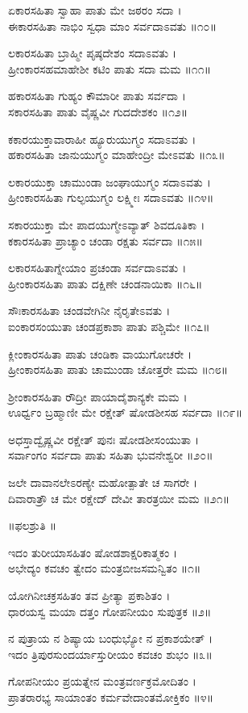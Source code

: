 ಏಕಾರಸಹಿತಾ ಸ್ವಾಹಾ ಪಾತು ಮೇ ಜಠರಂ ಸದಾ ।\\
ಈಕಾರಸಹಿತಾ ನಾಭಿಂ ಸ್ವಧಾ ಮಾಂ ಸರ್ವದಾಽವತು ॥೧೦॥

ಲಕಾರಸಹಿತಾ ಬ್ರಾಹ್ಮೀ ಪೃಷ್ಠದೇಶಂ ಸದಾಽವತು ।\\
ಹ್ರೀಂಕಾರಸಹಮಾಹೇಶೀ ಕಟಿಂ ಪಾತು ಸದಾ ಮಮ ॥೧೧॥

ಹಕಾರಸಹಿತಾ ಗುಹ್ಯಂ ಕೌಮಾರೀ ಪಾತು ಸರ್ವದಾ ।\\
ಸಕಾರಸಹಿತಾ ಪಾತು ವೈಷ್ಣವೀ ಗುದದೇಶಕಂ ॥೧೨॥

ಕಕಾರಯುಕ್ತಾವಾರಾಹೀ ಹ್ಯೂರುಯುಗ್ಮಂ ಸದಾಽವತು ।\\
ಹಕಾರಸಹಿತಾ ಜಾನುಯುಗ್ಮಂ ಮಾಹೇಂದ್ರೀ ಮೇಽವತು ॥೧೩॥

ಲಕಾರಯುಕ್ತಾ ಚಾಮುಂಡಾ ಜಂಘಾಯುಗ್ಮಂ ಸದಾಽವತು ।\\
ಹ್ರೀಂಕಾರಸಹಿತಾ ಗುಲ್ಫಯುಗ್ಮಂ ಲಕ್ಷ್ಮೀಃ ಸದಾಽವತು ॥೧೪॥

ಸಕಾರಯುಕ್ತಾ ಮೇ ಪಾದಯುಗ್ಮೇಽವ್ಯಾತ್ ಶಿವದೂತಿಕಾ ।\\
ಕಕಾರಸಹಿತಾ ಪ್ರಾಚ್ಯಾಂ ಚಂಡಾ ರಕ್ಷತು ಸರ್ವದಾ ॥೧೫॥

ಲಕಾರಸಹಿತಾಗ್ನೇಯಾಂ ಪ್ರಚಂಡಾ ಸರ್ವದಾಽವತು ।\\
ಹ್ರೀಂಕಾರಸಹಿತಾ ಪಾತು ದಕ್ಷಿಣೇ ಚಂಡನಾಯಿಕಾ ॥೧೬॥

ಸೌಃಕಾರಸಹಿತಾ ಚಂಡವೇಗಿನೀ ನೈರೃತೇಽವತು ।\\
ಐಂಕಾರಸಂಯುತಾ ಚಂಡಪ್ರಕಾಶಾ ಪಾತು ಪಶ್ಚಿಮೇ ॥೧೭॥

ಕ್ಲೀಂಕಾರಸಹಿತಾ ಪಾತು ಚಂಡಿಕಾ ವಾಯುಗೋಚರೇ ।\\
ಹ್ರೀಂಕಾರಸಹಿತಾ ಪಾತು ಚಾಮುಂಡಾ ಚೋತ್ತರೇ ಮಮ ॥೧೮॥

ಶ್ರೀಂಕಾರಸಹಿತಾ ರೌದ್ರೀ ಪಾಯಾದೈಶಾನ್ಯಕೇ ಮಮ ।\\
ಊರ್ಧ್ವಂ ಬ್ರಹ್ಮಾಣೀ ಮೇ ರಕ್ಷೇತ್ ಷೋಡಶೀಸಹ ಸರ್ವದಾ ॥೧೯॥

ಅಧಸ್ತಾದ್ವೈಷ್ಣವೀ ರಕ್ಷೇತ್ ಪುನಃ ಷೋಡಶೀಸಂಯುತಾ ।\\
ಸರ್ವಾಂಗಂ ಸರ್ವದಾ ಪಾತು ಸಹಿತಾ ಭುವನೇಶ್ವರೀ ॥೨೦॥

ಜಲೇ ದಾವಾನಲೇಽರಣ್ಯೇ ಮಹೋತ್ಪಾತೇ ಚ ಸಾಗರೇ ।\\
ದಿವಾರಾತ್ರೌ ಚ ಮೇ ರಕ್ಷೇದ್ ದೇವೀ ತಾರತ್ರಯೀ ಮಮ ॥೨೧॥

॥ಫಲಶ್ರುತಿ ॥

ಇದಂ ತುರೀಯಾಸಹಿತಂ ಷೋಡಶಾಕ್ಷರಿಕಾತ್ಮಕಂ ।\\
ಅಭೇದ್ಯಂ ಕವಚಂ ತ್ವೇದಂ ಮಂತ್ರಬೀಜಸಮನ್ವಿತಂ ॥೧॥

ಯೋಗಿನೀಚಕ್ರಸಹಿತಂ ತವ ಪ್ರೀತ್ಯಾ ಪ್ರಕಾಶಿತಂ ।\\
ಧಾರಯಸ್ವ ಮಯಾ ದತ್ತಂ ಗೋಪನೀಯಂ ಸುಪುತ್ರಕ ॥೨॥

ನ ಪುತ್ರಾಯ ನ ಶಿಷ್ಯಾಯ ಬಂಧುಭ್ಯೋ ನ ಪ್ರಕಾಶಯೇತ್ ।\\
ಇದಂ ತ್ರಿಪುರಸುಂದರ್ಯಾಸ್ತುರೀಯಂ ಕವಚಂ ಶುಭಂ ॥೩॥

ಗೋಪನೀಯಂ ಪ್ರಯತ್ನೇನ ಮಂತ್ರವರ್ಣಕ್ರಮೋದಿತಂ ।\\
ಪ್ರಾತರಾರಭ್ಯ ಸಾಯಾಂತಂ ಕರ್ಮವೇದಾಂತಮೋಕ್ತಿಕಂ ॥೪॥

